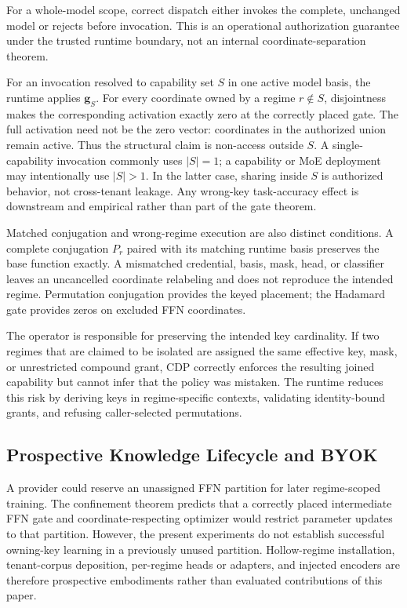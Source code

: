 \documentclass[11pt,a4paper]{article}
\newcommand{\bg}{\mathbf{g}}
\begin{document}
For a whole-model scope, correct dispatch either invokes the complete,
unchanged model or rejects before invocation.  This is an operational
authorization guarantee under the trusted runtime boundary, not an
internal coordinate-separation theorem.

For an invocation resolved to capability set $S$ in one active model
basis, the runtime applies $\bg_S$.  For every coordinate owned by a
regime $r\notin S$,
disjointness makes the corresponding activation exactly zero at
the correctly placed gate.  The full activation need not be the
zero vector: coordinates in the authorized union remain active.
Thus the structural claim is non-access outside $S$.  A
single-capability invocation commonly uses $|S|=1$; a capability or MoE
deployment may intentionally use $|S|>1$.  In the latter case,
sharing inside $S$ is authorized behavior, not cross-tenant leakage.
Any wrong-key task-accuracy effect is downstream and empirical rather
than part of the gate theorem.

Matched conjugation and wrong-regime execution are also distinct
conditions.  A complete conjugation $P_r$ paired with its matching
runtime basis preserves the base function exactly.  A mismatched
credential, basis, mask, head, or classifier leaves an uncancelled
coordinate relabeling and does not reproduce the intended regime.
Permutation conjugation provides the keyed placement; the Hadamard
gate provides zeros on excluded FFN coordinates.

The operator is responsible for preserving the intended key
cardinality.  If two regimes that are claimed to be isolated are
assigned the same effective key, mask, or unrestricted compound
grant, CDP correctly enforces the resulting joined capability but
cannot infer that the policy was mistaken.  The runtime reduces this
risk by deriving keys in regime-specific contexts, validating
identity-bound grants, and refusing caller-selected permutations.

\subsection{Prospective Knowledge Lifecycle and BYOK}

A provider could reserve an unassigned FFN partition for later
regime-scoped training.  The confinement theorem predicts that a
correctly placed intermediate FFN gate and coordinate-respecting
optimizer would restrict parameter updates to that partition.
However, the present experiments do not establish successful
owning-key learning in a previously unused partition.  Hollow-regime
installation, tenant-corpus deposition, per-regime heads or adapters,
and injected encoders are therefore prospective embodiments rather
than evaluated contributions of this paper.
\end{document}
